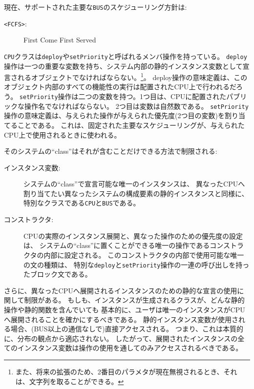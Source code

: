 \documentclass[\pformat,12pt]{jarticle}
\begin{document}
\begin{description}
現在、サポートされた主要な\texttt{BUS}のスケジューリング方針は:
\begin{description}
\item[\texttt{<FCFS>}:] First Come First Served
\end{description} 

\texttt{CPU}クラスは\texttt{deploy}や\texttt{setPriority}と呼ばれるメンバ操作を持っている。
\texttt{deploy}操作は一つの重要な変数を持ち、システム内部の静的インスタンス変数として宣言されるオブジェクトでなければならない。\footnote{また、将来の拡張のため、2番目のパラメタが現在無視されるとき、それは、文字列を取ることができる。}。
deploy操作の意味定義は、このオブジェクト内部のすべての機能性の実行は配置されたCPU上で行われるだろう。
\texttt{setPriority}操作は二つの変数を持つ。1つ目は、CPUに配置されたパブリックな操作名でなければならない。
2つ目は変数は自然数である。
\texttt{setPriority}操作の意味定義は、与えられた操作が与えられた優先度(2つ目の変数)を割り当てることである。
これは、固定された主要なスケジューリングが、与えられたCPU上で使用されるときに使われる。

そのシステムの``class''はそれが含むことだけできる方法で制限される:
\begin{description}
\item[インスタンス変数:] システムの``class''で宣言可能な唯一のインスタンスは、
異なったCPUへ割り当てたい異なったシステムの構成要素の静的インスタンスと同様に、
特別なクラスである\texttt{CPU}と\texttt{BUS}である。

\item[コンストラクタ:] CPUの実際のインスタンス展開と、異なった操作のための優先度の設定は、
システムの``class''に置くことができる唯一の操作であるコンストラクタの内部に設定される。
このコンストラクタの内部で使用可能な唯一の文の種類は、
特別な\texttt{deploy}と\texttt{setPriority}操作の一連の呼び出しを持ったブロック文である。

\end{description}

さらに、異なったCPUへ展開されるインスタンスのための静的な宣言の使用に関して制限がある。
もしも、インスタンスが生成されるクラスが、どんな静的操作や静的関数を含んでいても
基本的に、ユーザは唯一のインスタンスがCPUへ展開されることを確かにするべきである。
静的インスタンス変数が使用される場合、(BUS以上の通信なしで)直接アクセスされる。
つまり、これは本質的に、分布の観点から適応されない。
したがって、展開されたインスタンスの全てのインスタンス変数は操作の使用を通してのみアクセスされるべきである。


\end{description}
\end{document}

